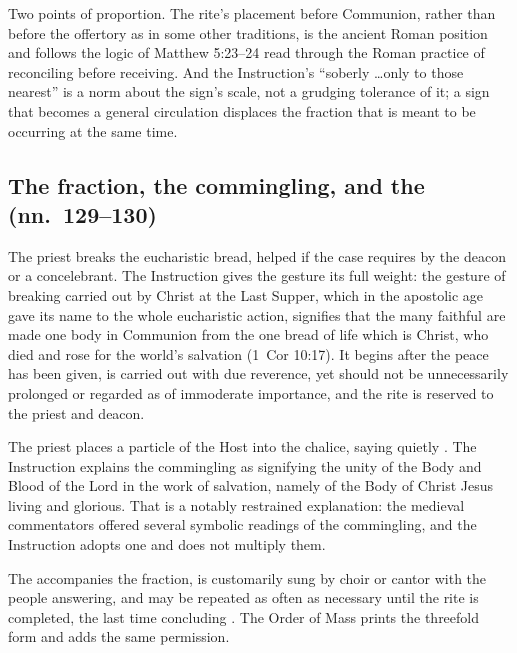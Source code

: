 Two points of proportion. The rite's placement before Communion, rather than before the
offertory as in some other traditions, is the ancient Roman position and follows the logic of
Matthew 5:23--24 read through the Roman practice of reconciling before receiving. And the
Instruction's ``soberly \ldots only to those nearest'' is a norm about the sign's scale, not a
grudging tolerance of it; a sign that becomes a general circulation displaces the fraction that
is meant to be occurring at the same time.

\subsection{The fraction, the commingling, and the  (nn.\ 129--130)}

The priest breaks the eucharistic bread, helped if the case requires by the deacon or a
concelebrant. The Instruction gives the gesture its full weight: the gesture of breaking carried
out by Christ at the Last Supper, which in the apostolic age gave its name to the whole
eucharistic action, signifies that the many faithful are made one body in Communion from the
one bread of life which is Christ, who died and rose for the world's salvation (1~Cor 10:17). It
begins after the peace has been given, is carried out with due reverence, yet should not be
unnecessarily prolonged or regarded as of immoderate importance, and the rite is reserved to the
priest and deacon.

The priest places a particle of the Host into the chalice, saying quietly .
The Instruction explains the commingling as signifying the unity of the Body and Blood of the
Lord in the work of salvation, namely of the Body of Christ Jesus living and glorious. That is a
notably restrained explanation: the medieval commentators offered several symbolic readings of
the commingling, and the Instruction adopts one and does not multiply them.

The  accompanies the fraction, is customarily sung by choir or cantor with the
people answering, and may be repeated as often as necessary until the rite is completed, the
last time concluding . The Order of Mass prints the threefold form and
adds the same permission.

